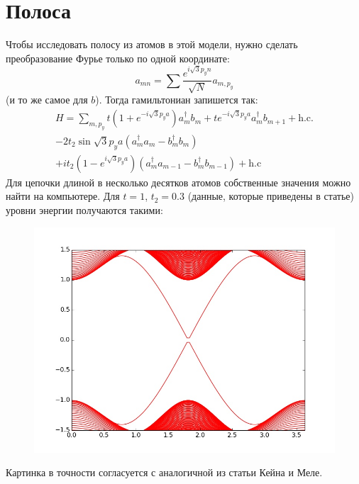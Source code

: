 \documentclass{article}
\begin{document}
	\section{Полоса}
	Чтобы исследовать полосу из атомов в этой модели, нужно сделать преобразование Фурье
	только по одной координате:
	\begin{equation}
		a_{mn} = \sum \frac{e^{i\sqrt{3}p_yn}}{\sqrt{N}} a_{m,p_y}
	\end{equation}
	(и то же самое для $b$). Тогда гамильтониан запишется так:
	\begin{multline}
		H = \sum_{m, p_y} t(1+e^{-i\sqrt{3}p_ya}) a_m^\dagger b_m
		 + te^{-i\sqrt{3}p_ya} a_m^\dagger b_{m+1} + \mbox{h.c.} \\
		- 2t_2 \sin{\sqrt{3} p_ya} (a_m^\dagger a_m -  b_m^\dagger b_m)\\
		+ it_2(1 - e^{i\sqrt{3}p_ya}) (a_m^\dagger a_{m-1} - b_m^\dagger b_{m-1}) 
		+ \mbox{h.c}
	\end{multline}
	Для цепочки длиной в несколько десятков атомов собственные значения можно найти на 
	компьютере. Для $t = 1$, $t_2 = 0.3$ (данные, которые приведены в статье) уровни 
	энергии получаются такими:
	\begin{figure}[h]
		\includegraphics[width=\linewidth]{levels.jpg}
	\end{figure}

	Картинка в точности согласуется с аналогичной из статьи Кейна и Меле.
\end{document}
